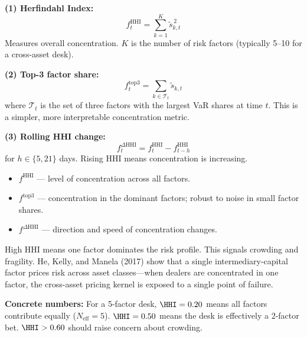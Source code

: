 \begin{definition}
\textbf{(1) Herfindahl Index:}
\begin{equation}
\label{eq:feat-hhi}
f^{\text{HHI}}_t = \sum_{k=1}^{K} \tilde{s}_{k,t}^{\,2}
\end{equation}
Measures overall concentration.  $K$ is the number of risk factors
(typically 5--10 for a cross-asset desk).

\textbf{(2) Top-3 factor share:}
\begin{equation}
\label{eq:top3}
f^{\text{top3}}_t = \sum_{k \in \mathcal{T}_t} \tilde{s}_{k,t}
\end{equation}
where $\mathcal{T}_t$ is the set of three factors with the largest
VaR shares at time $t$.  This is a simpler, more interpretable
concentration metric.

\textbf{(3) Rolling HHI change:}
\begin{equation}
\label{eq:delta-hhi}
f^{\Delta\text{HHI}}_t = f^{\text{HHI}}_t - f^{\text{HHI}}_{t-h}
\end{equation}
for $h \in \{5, 21\}$ days.  Rising HHI means concentration is
increasing.

\begin{itemize}[nosep]
  \item $f^{\text{HHI}}$ --- level of concentration across all factors.
  \item $f^{\text{top3}}$ --- concentration in the dominant factors;
        robust to noise in small factor shares.
  \item $f^{\Delta\text{HHI}}$ --- direction and speed of
        concentration changes.
\end{itemize}
\end{definition}

\begin{keyidea}[High HHI = Concentrated Risk = Fragility]
High HHI means one factor dominates the risk profile.  This signals
crowding and fragility.  He, Kelly, and Manela (2017) show that a single
intermediary-capital factor prices risk across asset classes---when
dealers are concentrated in one factor, the cross-asset pricing kernel
is exposed to a single point of failure.

\textbf{Concrete numbers:} For a 5-factor desk, $\HHI = 0.20$ means
all factors contribute equally ($N_{\text{eff}} = 5$).  $\HHI = 0.50$
means the desk is effectively a 2-factor bet.  $\HHI > 0.60$ should
raise concern about crowding.
\end{keyidea}


